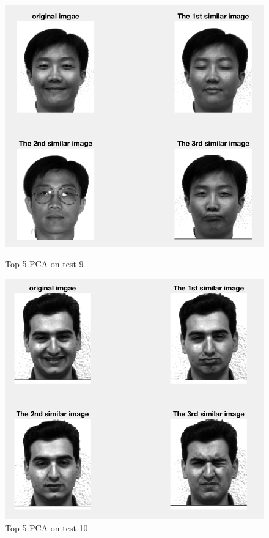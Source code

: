 \documentclass{article}
\begin{document}
\begin{figure}[htbp]
\centering
\begin{minipage}[t]{0.48\textwidth}
\centering
\includegraphics[scale = 0.3]{5_9.png}
\caption{Top 5 PCA on test 9}
\end{minipage}
\begin{minipage}[t]{0.48\textwidth}
\centering
\includegraphics[scale = 0.3]{5_10.png}
\caption{Top 5 PCA on test 10}
\end{minipage}
\end{figure}
\end{document}
